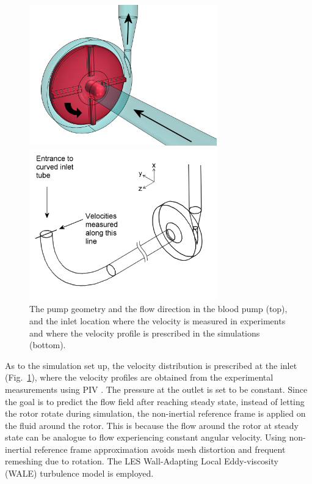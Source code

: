 \begin{figure}[htbp]
    \centering
    \begin{minipage}[c][2.5in][c]{0.9\linewidth}
        \centering
        \includegraphics[width=3.2in]{imgs/nozzle_pump/housing_and_rotor.png}
    \end{minipage}
    \begin{minipage}[c][2.5in][c]{0.9\linewidth}
        \centering
        \includegraphics[width=3.2in]{imgs/nozzle_pump/inlet_velcocity_profile_location.png}
    \end{minipage}
    \caption{The pump geometry and the flow direction in the blood pump (top), and the inlet location where the velocity is measured in experiments and where the velocity profile is prescribed in the simulations (bottom).}
    \label{fig:pumpgeo}
\end{figure}

As to the simulation set up, the velocity distribution is prescribed at the inlet (Fig.~\ref{fig:pumpgeo}), where the velocity profiles are obtained from the experimental measurements using PIV \cite{cpi}. The pressure at the outlet is set to be constant. Since the goal is to predict the flow field after reaching steady state, instead of letting the rotor rotate during simulation, the non-inertial reference frame is applied on the fluid around the rotor. This is because the flow around the rotor at steady state can be analogue to flow experiencing constant angular velocity. Using non-inertial reference frame approximation avoids mesh distortion and frequent remeshing due to rotation. The LES Wall-Adapting Local Eddy-viscosity (WALE) \cite{wale} turbulence model is employed. 

